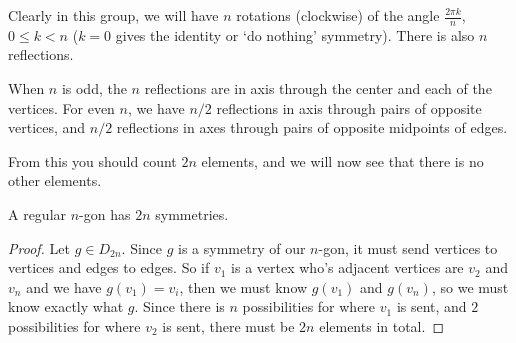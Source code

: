 Clearly in this group, we will have $n$ rotations (clockwise) of the angle $\frac{2 \pi k}{n}$, $0 \leq k < n$ ($k = 0$ gives the identity or `do nothing' symmetry). There is also $n$ reflections.
\begin{center}
	


\end{center}
When $n$ is odd, the $n$ reflections are in axis through the center and each of the vertices. For even $n$, we have $n/2$ reflections in axis through pairs of opposite vertices, and $n / 2$ reflections in axes through pairs of opposite midpoints of edges.

From this you should count $2n$ elements, and we will now see that there is no other elements.

\begin{proposition}
	A regular $n$-gon has $2n$ symmetries.
\end{proposition}
\begin{proof}
	Let $g \in D_{2n}$. Since $g$ is a symmetry of our $n$-gon, it must send vertices to vertices and edges to edges. So if $v_1$ is a vertex who's adjacent vertices are $v_2$ and $v_n$ and we have $g(v_1) = v_i$, then we must know $g(v_1)$ and $g(v_n)$, so we must know exactly what $g$. Since there is $n$ possibilities for where $v_1$ is sent, and $2$ possibilities for where $v_2$ is sent, there must be $2n$ elements in total.
\end{proof}

